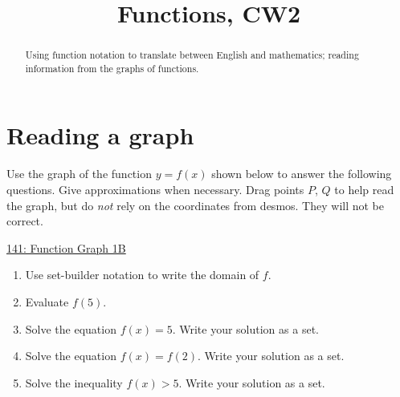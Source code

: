 \documentclass{ximera}
\title{Functions, CW2}
\begin{document}
\begin{abstract}
Using function notation to translate between English and mathematics; reading information from the graphs of functions.
\end{abstract}
\maketitle



\section{Reading a graph}

\begin{example} \label{ELDF3lr3r3}

Use the graph of the function $y=f(x)$ shown below to answer the following questions. Give approximations when necessary. Drag points $P$, $Q$ to help read the graph, but do \emph{not} rely on the coordinates from desmos. They will not be correct.


\begin{onlineOnly}
    \begin{center}
\end{center}
\end{onlineOnly}

\href{https://www.desmos.com/calculator/nziricslpv}{141: Function Graph 1B}

\begin{enumerate}
\item Use set-builder notation to write the domain of $f$.


\item Evaluate $f(5)$.

\item Solve the equation $f(x)=5$. Write your solution as a set.

\item Solve the equation $f(x)=f(2)$. Write your solution as a set.



\item Solve the inequality $f(x)>5$. Write your solution as a set.


\end{enumerate}
\end{example}
\end{document}
